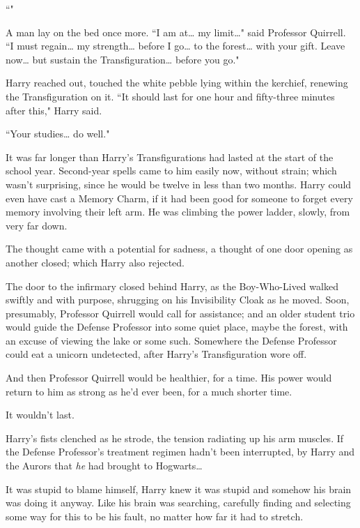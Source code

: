 ``"

A man lay on the bed once more. ``I am at{\ldots} my limit{\ldots}" said Professor Quirrell. ``I must regain{\ldots} my strength{\ldots} before I go{\ldots} to the forest{\ldots} with your gift. Leave now{\ldots} but sustain the Transfiguration{\ldots} before you go."

Harry reached out, touched the white pebble lying within the kerchief, renewing the Transfiguration on it. ``It should last for one hour and fifty-three minutes after this," Harry said.

``Your studies{\ldots} do well."

It was far longer than Harry's Transfigurations had lasted at the start of the school year. Second-year spells came to him easily now, without strain; which wasn't surprising, since he would be twelve in less than two months. Harry could even have cast a Memory Charm, if it had been good for someone to forget every memory involving their left arm. He was climbing the power ladder, slowly, from very far down.

The thought came with a potential for sadness, a thought of one door opening as another closed; which Harry also rejected.

\later

The door to the infirmary closed behind Harry, as the Boy-Who-Lived walked swiftly and with purpose, shrugging on his Invisibility Cloak as he moved. Soon, presumably, Professor Quirrell would call for assistance; and an older student trio would guide the Defense Professor into some quiet place, maybe the forest, with an excuse of viewing the lake or some such. Somewhere the Defense Professor could eat a unicorn undetected, after Harry's Transfiguration wore off.

And then Professor Quirrell would be healthier, for a time. His power would return to him as strong as he'd ever been, for a much shorter time.

It wouldn't last.

Harry's fists clenched as he strode, the tension radiating up his arm muscles. If the Defense Professor's treatment regimen hadn't been interrupted, by Harry and the Aurors that \emph{he} had brought to Hogwarts{\ldots}

It was stupid to blame himself, Harry knew it was stupid and somehow his brain was doing it anyway. Like his brain was searching, carefully finding and selecting some way for this to be his fault, no matter how far it had to stretch.

